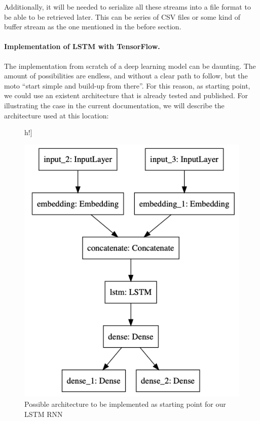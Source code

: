 Additionally, it will be needed to serialize all these streams into a file format to be
able to be retrieved later. This can be series of CSV files or some kind of buffer stream
as the one mentioned in the before section.


\paragraph{Implementation of LSTM with TensorFlow.} The implementation from scratch of a deep learning
model can be daunting. The amount of possibilities are endless, and without a clear path
to follow, but the moto “start simple and build-up from there”. For this reason, as
starting point, we could use an existent architecture that is already tested and
published. For illustrating the case in the current documentation, we will describe the
architecture used at this location:

\begin{figure}[]h!]
  \caption{Possible architecture to be implemented as starting point for our LSTM RNN }
  \includegraphics[width=\linewidth]{image/fig_JDF21.png}
\end{figure}


